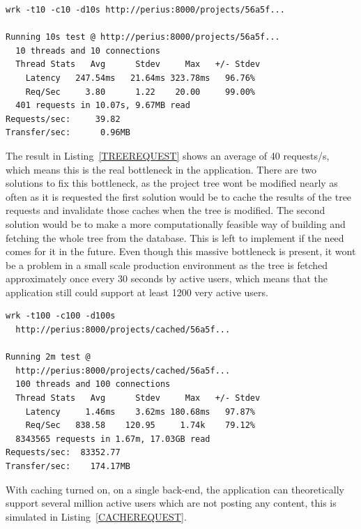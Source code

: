 \documentclass[a4paper,12pt]{article}
\begin{document}
\begin{minipage}{\linewidth-1cm}
\begin{lstlisting}[label=TREEREQUEST,caption=Result of project tree requests]
wrk -t10 -c10 -d10s http://perius:8000/projects/56a5f...
 
Running 10s test @ http://perius:8000/projects/56a5f...
  10 threads and 10 connections
  Thread Stats   Avg      Stdev     Max   +/- Stdev
    Latency   247.54ms   21.64ms 323.78ms   96.76%
    Req/Sec     3.80      1.22    20.00     99.00%
  401 requests in 10.07s, 9.67MB read
Requests/sec:     39.82
Transfer/sec:      0.96MB
\end{lstlisting}
\end{minipage}

The result in Listing~\ref{TREEREQUEST} shows an average of 40 requests/s, which means this is the
real bottleneck in the application. There are two solutions to fix this bottleneck, as the project
tree wont be modified nearly as often as it is requested the first solution would be to cache the
results of the tree requests and invalidate those caches when the tree is modified. The second
solution would be to make a more computationally feasible way of building and fetching the whole 
tree from the database. This is left to implement if the need comes for it in the future. Even
though this massive bottleneck is present, it wont be a problem in a small scale production
environment as the tree is fetched approximately once every 30 seconds by active users, which means
that the application still could support at least 1200 very active users.

\begin{minipage}{\linewidth-1cm}
\begin{lstlisting}[label=CACHEREQUEST,caption=Result of cached project tree requests]
wrk -t100 -c100 -d100s 
  http://perius:8000/projects/cached/56a5f...
 
Running 2m test @ 
  http://perius:8000/projects/cached/56a5f...
  100 threads and 100 connections
  Thread Stats   Avg      Stdev     Max   +/- Stdev
    Latency     1.46ms    3.62ms 180.68ms   97.87%
    Req/Sec   838.58    120.95     1.74k    79.12%
  8343565 requests in 1.67m, 17.03GB read
Requests/sec:  83352.77
Transfer/sec:    174.17MB
\end{lstlisting}
\end{minipage}

\par
With caching turned on, on a single back-end, the application can theoretically support several 
million active users which are not posting any content, this is simulated in 
Listing~\ref{CACHEREQUEST}.
\end{document}
